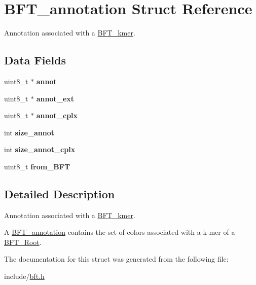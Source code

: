 \hypertarget{structBFT__annotation}{}\section{B\+F\+T\+\_\+annotation Struct Reference}
\label{structBFT__annotation}


Annotation associated with a \hyperlink{structBFT__kmer}{B\+F\+T\+\_\+kmer}.  


\subsection*{Data Fields}
\begin{DoxyCompactItemize}
\item 
\hypertarget{structBFT__annotation_aa286433f7ad06a2e40862186dc93cba4}{}uint8\+\_\+t $\ast$ {\bfseries annot}\label{structBFT__annotation_aa286433f7ad06a2e40862186dc93cba4}

\item 
\hypertarget{structBFT__annotation_affce4cc9bed923fbc5bb884eb4a6798a}{}uint8\+\_\+t $\ast$ {\bfseries annot\+\_\+ext}\label{structBFT__annotation_affce4cc9bed923fbc5bb884eb4a6798a}

\item 
\hypertarget{structBFT__annotation_aa0175d255a5d43991a7a1bd9ca9d3b9f}{}uint8\+\_\+t $\ast$ {\bfseries annot\+\_\+cplx}\label{structBFT__annotation_aa0175d255a5d43991a7a1bd9ca9d3b9f}

\item 
\hypertarget{structBFT__annotation_a811c32fbbd0cecb9fdcc4588016bf170}{}int {\bfseries size\+\_\+annot}\label{structBFT__annotation_a811c32fbbd0cecb9fdcc4588016bf170}

\item 
\hypertarget{structBFT__annotation_ab241457b872fc5d1f082edfc532eccb0}{}int {\bfseries size\+\_\+annot\+\_\+cplx}\label{structBFT__annotation_ab241457b872fc5d1f082edfc532eccb0}

\item 
\hypertarget{structBFT__annotation_ae5b18246fa3dea4abda1f679e46fc03c}{}uint8\+\_\+t {\bfseries from\+\_\+\+B\+F\+T}\label{structBFT__annotation_ae5b18246fa3dea4abda1f679e46fc03c}

\end{DoxyCompactItemize}


\subsection{Detailed Description}
Annotation associated with a \hyperlink{structBFT__kmer}{B\+F\+T\+\_\+kmer}. 

A \hyperlink{structBFT__annotation}{B\+F\+T\+\_\+annotation} contains the set of colors associated with a k-\/mer of a \hyperlink{structBFT__Root}{B\+F\+T\+\_\+\+Root}. 

The documentation for this struct was generated from the following file\+:\begin{DoxyCompactItemize}
\item 
include/\hyperlink{bft_8h}{bft.\+h}\end{DoxyCompactItemize}
